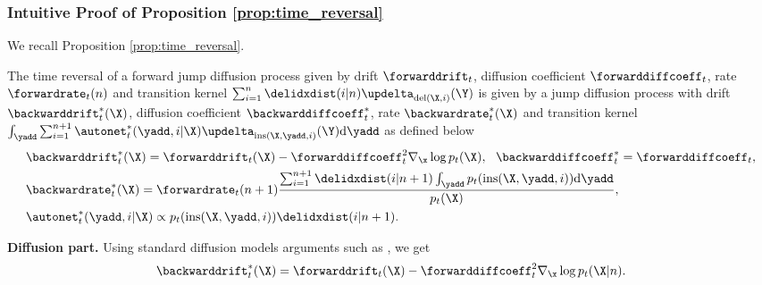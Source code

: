 \subsubsection{Intuitive Proof of Proposition \ref{prop:time_reversal}}
\label{sec:tddm-intuitive_time_reversal}

We recall Proposition \ref{prop:time_reversal}.

\setcounter{proposition}{0}
\begin{proposition}
The time reversal of a forward jump diffusion process given by drift $\forwarddrift_t$, diffusion coefficient $\forwarddiffcoeff_t$, rate $\forwardrate_t(n)$ and transition kernel $\sum_{i=1}^n \delidxdist(i | n) \updelta_{\textup{del}(\X, i)}(\Y)$ is given by a jump diffusion process with drift $\backwarddrift_t^*(\X)$, diffusion coefficient $\backwarddiffcoeff_t^*$, rate $\backwardrate_t^*(\X)$ and transition kernel $\int_{\yadd} \sum_{i=1}^{n+1}  \autonet^*_t(\yadd, i | \X) \updelta_{\textup{ins}(\X, \yadd, i)}(\Y) \rmd \yadd$ as defined below
\begin{align}
    &\backwarddrift_{t}^*(\X) = \forwarddrift_{t}(\X) - \forwarddiffcoeff_t^2 \nabla_{\x} \log p_{t}(\X),~~\backwarddiffcoeff_{t}^* = \forwarddiffcoeff_{t},\\
    & \backwardrate_{t}^*(\X) = \forwardrate_{t}(n+1) \frac{ \sum_{i=1}^{n+1} \delidxdist(i | n+1) \int_{\yadd} p_{t}( \textup{ins}(\X, \yadd, i)) \rmd \yadd }{p_{t}(\X)},\\
    & \autonet_{t}^*( \yadd, i | \X) \propto p_{t}(\textup{ins}(\X, \yadd, i) ) \delidxdist(i| n+1).
\end{align}
\end{proposition}





\textbf{Diffusion part. } Using standard diffusion models arguments such as
\cite{anderson1982reverse} \cite{conforti2022time}, we get
\begin{equation}
    \backwarddrift_{t}^*(\X) = \forwarddrift_t(\X) - \forwarddiffcoeff_t^2 \nabla_{\x} \log p_t(\X | n) . 
\end{equation}

